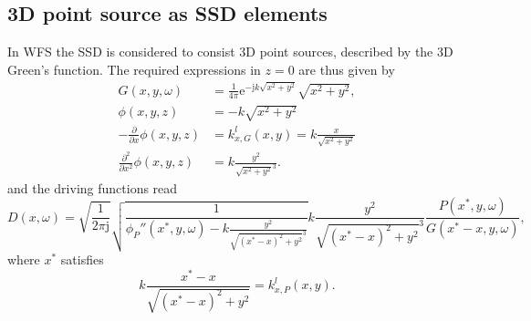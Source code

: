 \documentclass[12pt,a4paper]{article}
\newcommand{\te}{\mathrm{e}}
\newcommand{\ti}{\mathrm{j}}
\begin{document}
\subsection{3D point source as SSD elements}
In WFS the SSD is considered to consist 3D point sources, described by the 3D Green's function. The required expressions in $z=0$ are thus given by
\begin{align}
G(x,y,\omega)  &= \frac{1}{4\pi}\te^{-\ti k \sqrt{x^2+y^2}}{\sqrt{x^2 + y^2}},\\
\phi(x,y,z)    &= -k \sqrt{x^2+y^2} \\
-\frac{\partial}{\partial x} \phi(x,y,z)     &= k_{x,G}^l(x,y) = k \frac{x}{\sqrt{x^2+y^2}}\\
\frac{\partial^2}{\partial x^2} \phi(x,y,z) &= k\frac{y^2}{\sqrt{x^2+y^2}^3} .
\end{align}
and the driving functions read
\begin{equation}
D(x,\omega) = 
\sqrt{\frac{1}{2\pi \ti}}
\sqrt{\frac{1}{\phi_P''(x^*,y,\omega) - k\frac{y^2}{\sqrt{(x^*-x)^2+y^2}^3}}}
k\frac{y^2}{\sqrt{(x^*-x)^2+y^2}^3}
\frac{ P(x^*,y,\omega) }{G(x^*- x,y,\omega) },
\end{equation}
where $x^*$ satisfies
\begin{equation}
 k \frac{x^*-x}{\sqrt{(x^*-x)^2+y^2}} = k_{x,P}^l(x,y).
\end{equation}
\end{document}
